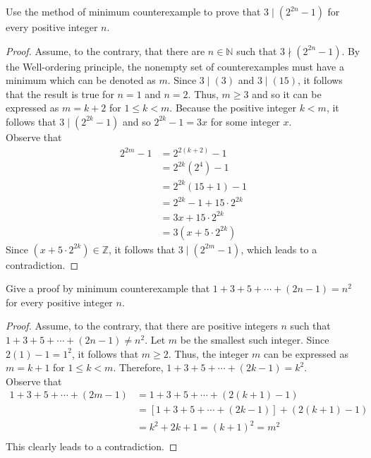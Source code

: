 \documentclass[12pt]{article}
\newcommand{\N}{\mathbb{N}}
\newcommand{\Z}{\mathbb{Z}}
\newenvironment{problem}[2][Problem]{\begin{trivlist}
		\item[\hskip \labelsep {\bfseries #1}\hskip \labelsep {\bfseries #2.}]}{\end{trivlist}}
\begin{document}
	\begin{problem}{34}
		Use the method of minimum counterexample to prove that $3\mid \left(2^{2n}-1\right)$ for every positive integer $n$.
		\begin{proof}
			Assume, to the contrary, that there are $n\in \N$ such that $3\nmid \left(2^{2n}-1\right)$. By the Well-ordering principle, the nonempty set of counterexamples must have a minimum which can be denoted as $m$. Since $3\mid (3)$ and $3\mid (15)$, it follows that the result is true for $n=1$ and $n=2$. Thus, $m\geq 3$ and so it can be expressed as $m=k+2$ for $1\leq k < m$. Because the positive integer $k<m$, it follows that $3\mid \left(2^{2k}-1\right)$ and so $2^{2k}-1 = 3x$ for some integer $x$.\\
			
			Observe that
			\begin{align*}
					2^{2m}-1 &= 2^{2(k+2)}-1 \\
				&= 2^{2k}\left(2^{4}\right) -1\\
				&= 2^{2k}\left(15+1\right)-1\\
				&= 2^{2k}-1+15\cdot2^{2k}\\
				&= 3x + 15\cdot2^{2k}\\
				&= 3\left(x+5\cdot2^{2k}\right)
			\end{align*}
		Since $(x+5\cdot2^{2k}) \in \Z$, it follows that $3\mid \left(2^{2m}-1\right)$, which leads to a contradiction.
		\end{proof}
	\end{problem}

	\begin{problem}{35}
		Give a proof by minimum counterexample that $1+3+5+\cdots+(2n-1) = n^{2}$ for every positive integer $n$.
		\begin{proof}
			Assume, to the contrary, that there are positive integers $n$ such that $1+3+5+\cdots+(2n-1) \neq n^{2}$. Let $m$ be the smallest such integer. Since $2(1) -1 = 1^{2}$, it follows that $m\geq 2$. Thus, the integer $m$ can be expressed as $m=k+1$ for $1\leq k < m$. Therefore, $1+3+5+\cdots + (2k-1) = k^{2}$. \\
			
			Observe that
			\begin{align*}
				1+3+5+\cdots+(2m-1) &= 1+3+5+\cdots+(2(k+1)-1)\\
				&= \left[1+3+5+\cdots+(2k-1)\right] + (2(k+1)-1)\\
				&= k^{2} +2k+1 = (k+1)^{2} = m^{2}\\
			\end{align*}
		This clearly leads to a contradiction.
		\end{proof}
	\end{problem}
\end{document}
